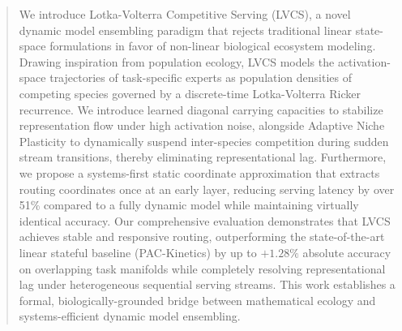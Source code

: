 \begin{abstract}
We introduce Lotka-Volterra Competitive Serving (LVCS), a novel dynamic model ensembling paradigm that rejects traditional linear state-space formulations in favor of non-linear biological ecosystem modeling. Drawing inspiration from population ecology, LVCS models the activation-space trajectories of task-specific experts as population densities of competing species governed by a discrete-time Lotka-Volterra Ricker recurrence. We introduce learned diagonal carrying capacities to stabilize representation flow under high activation noise, alongside Adaptive Niche Plasticity to dynamically suspend inter-species competition during sudden stream transitions, thereby eliminating representational lag. Furthermore, we propose a systems-first static coordinate approximation that extracts routing coordinates once at an early layer, reducing serving latency by over 51\% compared to a fully dynamic model while maintaining virtually identical accuracy. Our comprehensive evaluation demonstrates that LVCS achieves stable and responsive routing, outperforming the state-of-the-art linear stateful baseline (PAC-Kinetics) by up to $+1.28\%$ absolute accuracy on overlapping task manifolds while completely resolving representational lag under heterogeneous sequential serving streams. This work establishes a formal, biologically-grounded bridge between mathematical ecology and systems-efficient dynamic model ensembling.
\end{abstract}
